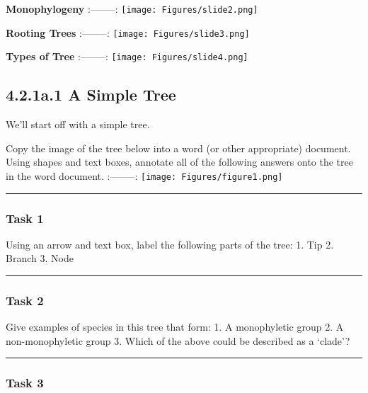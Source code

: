 \documentclass[
]{article}
\begin{document}
\textbf{Monophylogeny} \textbar:--------:\textbar{}
\texttt{[image: Figures/slide2.png]}

\textbf{Rooting Trees} \textbar:--------:\textbar{}
\texttt{[image: Figures/slide3.png]}

\textbf{Types of Tree} \textbar:--------:\textbar{}
\texttt{[image: Figures/slide4.png]}

\hypertarget{a.1-a-simple-tree}{%
\subsection{4.2.1a.1 A Simple Tree}\label{a.1-a-simple-tree}}

We'll start off with a simple tree.

Copy the image of the tree below into a word (or other appropriate)
document. Using shapes and text boxes, annotate all of the following
answers onto the tree in the word document. \textbar:--------:\textbar{}
\texttt{[image: Figures/figure1.png]}

\begin{center}\rule{0.5\linewidth}{0.5pt}\end{center}

\hypertarget{task-1}{%
\subsubsection{Task 1}\label{task-1}}

Using an arrow and text box, label the following parts of the tree: 1.
Tip 2. Branch 3. Node

\begin{center}\rule{0.5\linewidth}{0.5pt}\end{center}

\hypertarget{task-2}{%
\subsubsection{Task 2}\label{task-2}}

Give examples of species in this tree that form: 1. A monophyletic group
2. A non-monophyletic group 3. Which of the above could be described as
a `clade'?

\begin{center}\rule{0.5\linewidth}{0.5pt}\end{center}

\hypertarget{task-3}{%
\subsubsection{Task 3}\label{task-3}}
\end{document}

